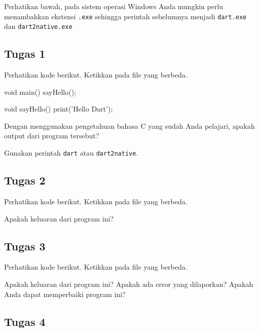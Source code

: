 \documentclass[a4paper,11pt]{article} %
\newcommand{\txtinline}[1]{\texttt{#1}}
\begin{document}
Perhatikan bawah, pada sistem operasi Windows Anda mungkin perlu menambahkan ekstensi
\txtinline{.exe} sehingga perintah sebelumnya menjadi
\txtinline{dart.exe} dan \txtinline{dart2native.exe}

\subsection{Tugas 1}

Perhatikan kode berikut. Ketikkan pada file yang berbeda.
\begin{dartcode}
void main() {
  sayHello();
}

void sayHello() {
  print('Hello Dart');
}
\end{dartcode}

Dengan menggunakan pengetahuan bahasa C yang sudah Anda pelajari, apakah
output dari program tersebut?

Gunakan perintah \txtinline{dart} atau \txtinline{dart2native}.


\subsection{Tugas 2}

Perhatikan kode berikut. Ketikkan pada file yang berbeda.

Apakah keluaran dari program ini?


\subsection{Tugas 3}

Perhatikan kode berikut. Ketikkan pada file yang berbeda.

Apakah keluaran dari program ini? Apakah ada error yang dilaporkan?
Apakah Anda dapat memperbaiki program ini?


\subsection{Tugas 4}
\end{document}
